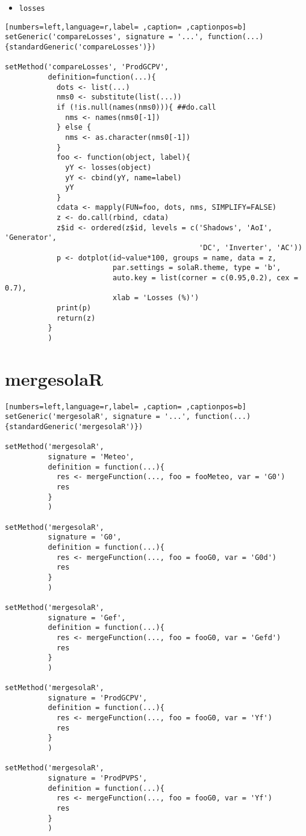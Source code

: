 \begin{itemize}
\item \texttt{losses}
\end{itemize}
\begin{lstlisting}[numbers=left,language=r,label= ,caption= ,captionpos=b]
setGeneric('compareLosses', signature = '...', function(...){standardGeneric('compareLosses')})

setMethod('compareLosses', 'ProdGCPV',
          definition=function(...){
            dots <- list(...)
            nms0 <- substitute(list(...))
            if (!is.null(names(nms0))){ ##do.call
              nms <- names(nms0[-1])
            } else {
              nms <- as.character(nms0[-1])
            }
            foo <- function(object, label){
              yY <- losses(object)
              yY <- cbind(yY, name=label)
              yY
            }
            cdata <- mapply(FUN=foo, dots, nms, SIMPLIFY=FALSE)
            z <- do.call(rbind, cdata)
            z$id <- ordered(z$id, levels = c('Shadows', 'AoI', 'Generator',
                                             'DC', 'Inverter', 'AC'))
            p <- dotplot(id~value*100, groups = name, data = z,
                         par.settings = solaR.theme, type = 'b',
                         auto.key = list(corner = c(0.95,0.2), cex = 0.7),
                         xlab = 'Losses (%)')
            print(p)
            return(z)
          }
          )
\end{lstlisting}
\section{mergesolaR}
\label{sec:orgf676513}
\begin{lstlisting}[numbers=left,language=r,label= ,caption= ,captionpos=b]
setGeneric('mergesolaR', signature = '...', function(...){standardGeneric('mergesolaR')})

setMethod('mergesolaR',
          signature = 'Meteo',
          definition = function(...){
            res <- mergeFunction(..., foo = fooMeteo, var = 'G0')
            res
          }
          )

setMethod('mergesolaR',
          signature = 'G0',
          definition = function(...){
            res <- mergeFunction(..., foo = fooG0, var = 'G0d')
            res
          }
          )

setMethod('mergesolaR',
          signature = 'Gef',
          definition = function(...){
            res <- mergeFunction(..., foo = fooG0, var = 'Gefd')
            res
          }
          )

setMethod('mergesolaR',
          signature = 'ProdGCPV',
          definition = function(...){
            res <- mergeFunction(..., foo = fooG0, var = 'Yf')
            res
          }
          )

setMethod('mergesolaR',
          signature = 'ProdPVPS',
          definition = function(...){
            res <- mergeFunction(..., foo = fooG0, var = 'Yf')
            res
          }
          )
\end{lstlisting}
